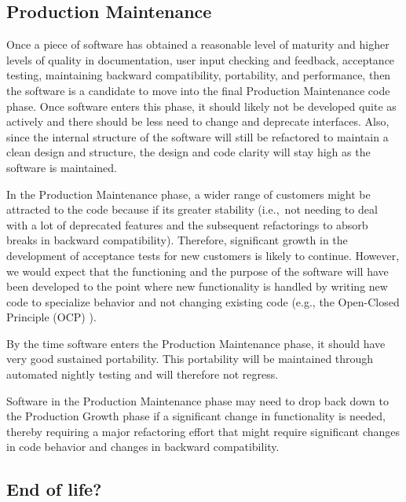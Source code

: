 \documentclass[11pt]{SANDreport}
\begin{document}
%
{}\subsection{Production Maintenance}
%

Once a piece of software has obtained a reasonable level of maturity
and higher levels of quality in documentation, user input checking and
feedback, acceptance testing, maintaining backward compatibility,
portability, and performance, then the software is a candidate to move
into the final Production Maintenance code phase.  Once software
enters this phase, it should likely not be developed quite as actively
and there should be less need to change and deprecate interfaces.
Also, since the internal structure of the software will still be
refactored to maintain a clean design and structure, the design and
code clarity will stay high as the software is maintained.

In the Production Maintenance phase, a wider range of customers might
be attracted to the code because if its greater stability (i.e.,\ not
needing to deal with a lot of deprecated features and the subsequent
refactorings to absorb breaks in backward compatibility).  Therefore,
significant growth in the development of acceptance tests for new
customers is likely to continue.  However, we would expect that the
functioning and the purpose of the software will have been developed
to the point where new functionality is handled by writing new code to
specialize behavior and not changing existing code (e.g., the
Open-Closed Principle (OCP) {}\cite{AgileSoftwareDevelopment}).

By the time software enters the Production Maintenance phase, it
should have very good sustained portability.  This portability will be
maintained through automated nightly testing and will therefore not
regress.

Software in the Production Maintenance phase may need to drop back
down to the Production Growth phase if a significant change in
functionality is needed, thereby requiring a major refactoring effort
that might require significant changes in code behavior and changes in
backward compatibility.


%
\subsection{End of life?}
%
\end{document}
